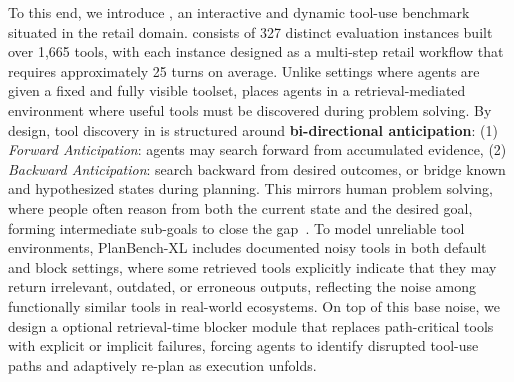 
To this end, we introduce \BENCH{}, an interactive and dynamic tool-use benchmark situated in the retail domain. 
\bench{} consists of 327 distinct evaluation instances built over 1,665 tools, with each instance designed as a multi-step retail workflow that requires approximately 25 turns on average.
Unlike settings where agents are given a fixed and fully visible toolset, \bench{} places agents in a retrieval-mediated environment where useful tools must be discovered during problem solving.
By design, tool discovery in \bench{} is structured around \textbf{bi-directional anticipation}: (1) \textit{Forward Anticipation}: agents may search forward from accumulated evidence, (2) \textit{Backward Anticipation}: search backward from desired outcomes, or bridge known and hypothesized states during planning.
This mirrors human problem solving, where people often reason from both the current state and the desired goal, forming intermediate sub-goals to close the gap~\citep{newell1972human}.
To model unreliable tool environments, PlanBench-XL includes documented noisy tools in both default and block settings, where some retrieved tools explicitly indicate that they may return irrelevant, outdated, or erroneous outputs, reflecting the noise among functionally similar tools in real-world ecosystems.
On top of this base noise, we design a optional retrieval-time blocker module that replaces path-critical tools with explicit or implicit failures, forcing agents to identify disrupted tool-use paths and adaptively re-plan as execution unfolds.


